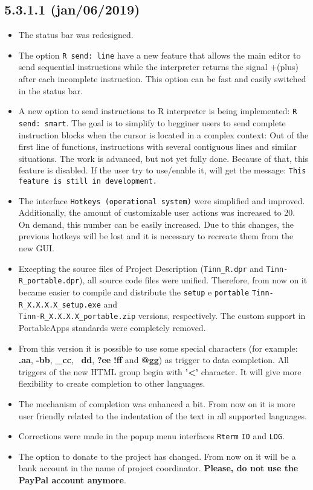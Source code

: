 \subsection*{5.3.1.1 (jan/06/2019)}
\begin{itemize}
  \item The status bar was redesigned.
  \item The option \texttt{R send: line} have a new feature that allows the main editor to send sequential instructions
    while the interpreter returns the signal +(plus) after each incomplete instruction. This option can be fast and easily switched in the status bar.
  \item A new option to send instructions to R interpreter is being implemented: \texttt{R send: smart}.
    The goal is to simplify to begginer users to send complete instruction blocks when the cursor is located in a complex context:
    Out of the first line of functions, instructions with several contiguous lines and similar situations.
    The work is advanced, but not yet fully done. Because of that, this feature is disabled. If the user try to use/enable it, will get the message:
    \texttt{This feature is still in development.}
  \item The interface \texttt{Hotkeys (operational system)} were simplified and improved. Additionally, the amount of customizable user actions
    was increased to 20. On demand, this number can be easily increased.
    Due to this changes, the previous hotkeys will be lost and it is necessary to recreate them from the new GUI.
  \item Excepting the source files of Project Description (\texttt{Tinn\_R.dpr} and \texttt{Tinn-R\_portable.dpr}),
   all source code files were unified. Therefore, from now on it became easier to compile and distribute the
   \texttt{setup} e \texttt{portable} \texttt{Tinn-R\_X.X.X.X\_setup.exe} and \\
   \texttt{Tinn-R\_X.X.X.X\_portable.zip} versions, respectively.
   The custom support in PortableApps standards were completely removed.
  \item From this version it is possible to use some special characters
    (for example: \textbf{.aa}, \textbf{-bb}, \textbf{\_cc}, \textbf{~dd}, \textbf{?ee} \textbf{!ff} and \textbf{@gg}) as trigger to data completion.
    All triggers of the new HTML group begin with \textbf{'<'} character. It will give more flexibility to create completion to other languages.
  \item The mechanism of completion was enhanced a bit. From now on it is more user friendly related to the indentation of the text in all supported languages.
  \item Corrections were made in the popup menu interfaces \texttt{Rterm} \texttt{IO} and \texttt{LOG}.
  \item The option to donate to the project has changed. From now on it will be a bank account in the name of project coordinator.
    \textbf{Please, do not use the PayPal account anymore}.
\end{itemize}